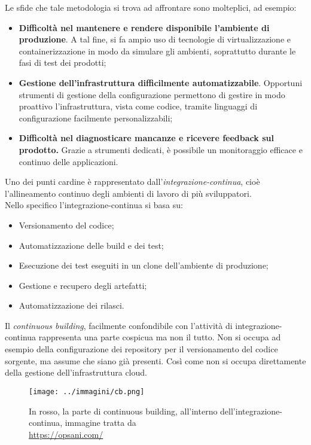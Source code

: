 Le sfide che tale metodologia si trova ad affrontare sono molteplici, ad esempio:

\begin{itemize}
    \item \textbf{Difficoltà nel mantenere e rendere disponibile l'ambiente di produzione}. A tal fine, si fa ampio uso di tecnologie di virtualizzazione e containerizzazione in modo da simulare gli ambienti, soprattutto durante le fasi di test dei prodotti;
    \item \textbf{Gestione dell'infrastruttura difficilmente automatizzabile}. Opportuni strumenti di gestione della configurazione permettono di gestire in modo proattivo l'infrastruttura, vista come codice, tramite linguaggi di configurazione facilmente personalizzabili;
    \item \textbf{Difficoltà nel diagnosticare mancanze e ricevere feedback sul prodotto.} Grazie a strumenti dedicati, è possibile un monitoraggio efficace e continuo delle applicazioni.  
\end{itemize}

Uno dei punti cardine è rappresentato dall'\textit{\gls{integrazione-continua}}, cioè l'allineamento continuo degli ambienti di lavoro di più sviluppatori. \\
Nello specifico l'\gls{integrazione-continua} si basa su:

\begin{itemize}
    \item Versionamento del codice;
    \item Automatizzazione delle build e dei test;
    \item Esecuzione dei test eseguiti in un clone dell'ambiente di produzione;
    \item Gestione e recupero degli artefatti;
    \item Automatizzazione dei rilasci.
\end{itemize} 

Il \textit{\gls{continuous building}}, facilmente confondibile con l'attività di \gls{integrazione-continua}
rappresenta una parte cospicua ma non il tutto. Non si occupa ad esempio della configurazione dei \gls{repository} per il versionamento del codice sorgente, ma assume che siano già presenti. Così come non si occupa direttamente della gestione dell'infrastruttura \gls{cloud}.

\begin{figure}[H]
    \capstart
    \centering
    \texttt{[image: ../immagini/cb.png]}
    \caption{In rosso, la parte di \gls{continuous building}, all'interno dell'\gls{integrazione-continua}, immagine tratta da \\ \url{https://opsani.com/}}
\end{figure}
 
